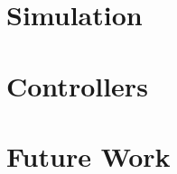 \documentclass[11pt]{beamer}
\begin{document}
\section{Simulation}
\begin{frame}{}

\end{frame}

\section{Controllers}
\begin{frame}{}

\end{frame}

\section{Future Work}
\begin{frame}{}

\end{frame}
\end{document}
